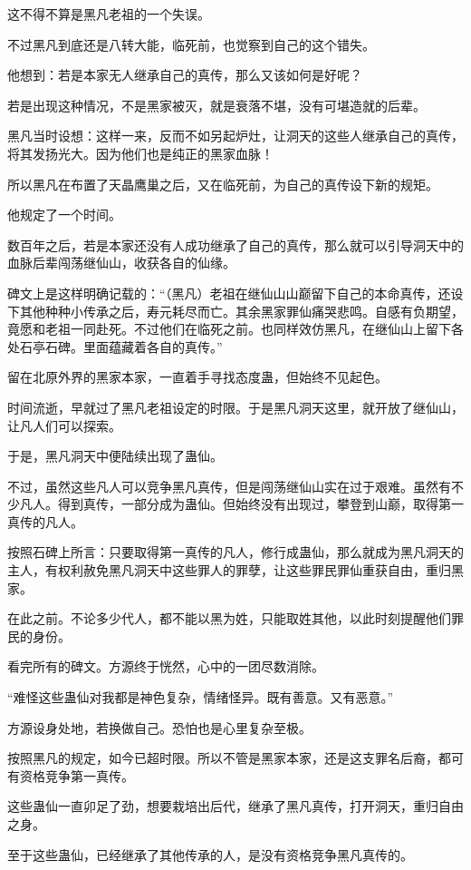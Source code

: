 \begin{this_body}
这不得不算是黑凡老祖的一个失误。

不过黑凡到底还是八转大能，临死前，也觉察到自己的这个错失。

他想到：若是本家无人继承自己的真传，那么又该如何是好呢？

若是出现这种情况，不是黑家被灭，就是衰落不堪，没有可堪造就的后辈。

黑凡当时设想：这样一来，反而不如另起炉灶，让洞天的这些人继承自己的真传，将其发扬光大。因为他们也是纯正的黑家血脉！

所以黑凡在布置了天晶鹰巢之后，又在临死前，为自己的真传设下新的规矩。

他规定了一个时间。

数百年之后，若是本家还没有人成功继承了自己的真传，那么就可以引导洞天中的血脉后辈闯荡继仙山，收获各自的仙缘。

碑文上是这样明确记载的：“（黑凡）老祖在继仙山山巅留下自己的本命真传，还设下其他种种小传承之后，寿元耗尽而亡。其余黑家罪仙痛哭悲鸣。自感有负期望，竟愿和老祖一同赴死。不过他们在临死之前。也同样效仿黑凡，在继仙山上留下各处石亭石碑。里面蕴藏着各自的真传。”

留在北原外界的黑家本家，一直着手寻找态度蛊，但始终不见起色。

时间流逝，早就过了黑凡老祖设定的时限。于是黑凡洞天这里，就开放了继仙山，让凡人们可以探索。

于是，黑凡洞天中便陆续出现了蛊仙。

不过，虽然这些凡人可以竞争黑凡真传，但是闯荡继仙山实在过于艰难。虽然有不少凡人。得到真传，一部分成为蛊仙。但始终没有出现过，攀登到山巅，取得第一真传的凡人。

按照石碑上所言：只要取得第一真传的凡人，修行成蛊仙，那么就成为黑凡洞天的主人，有权利赦免黑凡洞天中这些罪人的罪孽，让这些罪民罪仙重获自由，重归黑家。

在此之前。不论多少代人，都不能以黑为姓，只能取姓其他，以此时刻提醒他们罪民的身份。

看完所有的碑文。方源终于恍然，心中的一团尽数消除。

“难怪这些蛊仙对我都是神色复杂，情绪怪异。既有善意。又有恶意。”

方源设身处地，若换做自己。恐怕也是心里复杂至极。

按照黑凡的规定，如今已超时限。所以不管是黑家本家，还是这支罪名后裔，都可有资格竞争第一真传。

这些蛊仙一直卯足了劲，想要栽培出后代，继承了黑凡真传，打开洞天，重归自由之身。

至于这些蛊仙，已经继承了其他传承的人，是没有资格竞争黑凡真传的。


\end{this_body}
